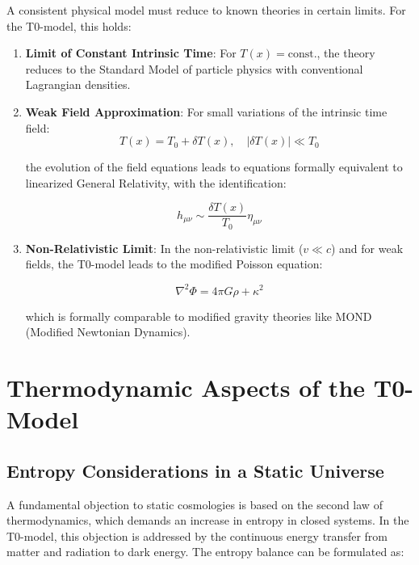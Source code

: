 \documentclass[a4paper,12pt]{article}
\theoremstyle{definition}
\theoremstyle{remark}
\newcommand{\Tfield}{T(x)} %
\begin{document}
	A consistent physical model must reduce to known theories in certain limits. For the T0-model, this holds:
	
	\begin{enumerate}
		\item \textbf{Limit of Constant Intrinsic Time}: For \(\Tfield = \text{const.}\), the theory reduces to the Standard Model of particle physics with conventional Lagrangian densities.
		
		\item \textbf{Weak Field Approximation}: For small variations of the intrinsic time field:
		\begin{equation}
			\Tfield = T_0 + \delta \Tfield, \quad |\delta \Tfield| \ll T_0
		\end{equation}
		
		the evolution of the field equations leads to equations formally equivalent to linearized General Relativity, with the identification:
		
		\begin{equation}
			h_{\mu\nu} \sim \frac{\delta \Tfield}{T_0} \eta_{\mu\nu}
		\end{equation}
		
		\item \textbf{Non-Relativistic Limit}: In the non-relativistic limit (\(v \ll c\)) and for weak fields, the T0-model leads to the modified Poisson equation:
		
		\begin{equation}
			\nabla^2 \Phi = 4\pi G \rho + \kappa^2
		\end{equation}
		
		which is formally comparable to modified gravity theories like MOND (Modified Newtonian Dynamics).
	\end{enumerate}
	
	\section{Thermodynamic Aspects of the T0-Model}
	
	\subsection{Entropy Considerations in a Static Universe}
	
	A fundamental objection to static cosmologies is based on the second law of thermodynamics, which demands an increase in entropy in closed systems. In the T0-model, this objection is addressed by the continuous energy transfer from matter and radiation to dark energy. The entropy balance can be formulated as:
	
\end{document}
